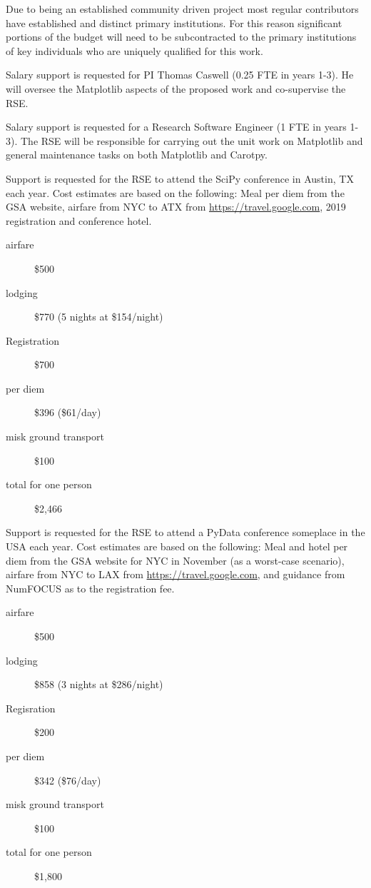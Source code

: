 \documentclass[12pt]{article}
\numberwithin{page}{section}
\begin{document}
Due to being an established community driven project most regular
contributors have established and distinct primary institutions.  For
this reason significant portions of the budget will need to be
subcontracted to the primary institutions of key individuals who are
uniquely qualified for this work.

Salary support is requested for PI Thomas Caswell (0.25 FTE in years
1-3).  He will oversee the Matplotlib aspects of the proposed work and
co-supervise the RSE.

Salary support is requested for a Research Software Engineer (1 FTE in
years 1-3).  The RSE will be responsible for carrying out the unit
work on Matplotlib and general maintenance tasks on both Matplotlib
and Carotpy.

Support is requested for the RSE to attend the SciPy conference in
Austin, TX each year.  Cost estimates are based on the following: Meal
per diem from the GSA website, airfare from NYC to ATX from
\url{https://travel.google.com}, 2019 registration and conference hotel.

\begin{description}
\item[airfare] \$500
\item [lodging] \$770 (5 nights at \$154/night)
\item [Registration] \$700
\item [per diem] \$396 (\$61/day)
\item [misk ground transport] \$100
\item [total for one person] \$2,466
\end{description}

Support is requested for the RSE to attend a PyData conference
someplace in the USA each year.  Cost estimates are based on the
following: Meal and hotel per diem from the GSA website for NYC in
November (as a worst-case scenario), airfare from NYC to LAX from
\url{https://travel.google.com}, and guidance from NumFOCUS as to the
registration fee.


\begin{description}
\item [airfare] \$500
\item [lodging] \$858 (3 nights at \$286/night)
\item [Regisration] \$200
\item [per diem] \$342 (\$76/day)
\item [misk ground transport] \$100
\item [total for one person] \$1,800
\end{description}
\end{document}
